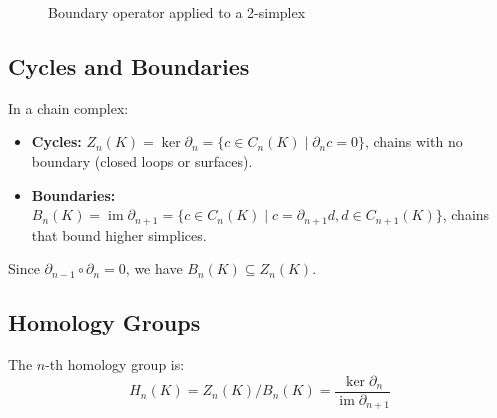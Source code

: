 \begin{figure}[h]
\centering
{}
\caption{Boundary operator applied to a 2-simplex}
\end{figure}

\subsection{Cycles and Boundaries}

\begin{definition}
In a chain complex:
\begin{itemize}
    \item \textbf{Cycles:} $Z_n(K) = \ker \partial_n = \{ c \in C_n(K) \mid \partial_n c = 0 \}$, chains with no boundary (closed loops or surfaces).
    \item \textbf{Boundaries:} $B_n(K) = \operatorname{im} \partial_{n+1} = \{ c \in C_n(K) \mid c = \partial_{n+1} d, d \in C_{n+1}(K) \}$, chains that bound higher simplices.
\end{itemize}
Since $\partial_{n-1} \circ \partial_n = 0$, we have $B_n(K) \subseteq Z_n(K)$.
\end{definition}

\subsection{Homology Groups}

\begin{definition}
The $n$-th homology group is:
\begin{equation}
H_n(K) = Z_n(K) / B_n(K) = \frac{\ker \partial_n}{\operatorname{im} \partial_{n+1}}
\end{equation}
\end{definition}


